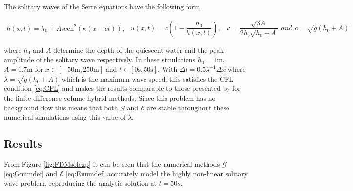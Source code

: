 \documentclass[SingleSpace,12pt,Journal]{Serre_ASCE}
\begin{document}
The solitary waves of the Serre equations have the following form
\begin{linenomath*}
\begin{subequations}
\begin{gather}
h\left(x,t\right) = h_0 + A\text{sech}^2\left( \kappa\left(x - ct\right)\right),
\end{gather}
\begin{gather}
u\left(x,t\right) = c\left(1 - \dfrac{h_0}{h(x,t)} \right),
\end{gather}
\begin{gather}
\kappa = \dfrac{\sqrt{3A}}{2h_0 \sqrt{ h_0 + A}}
\end{gather}
and
\begin{gather}
c = \sqrt{g \left(h_0 + A\right)}
\end{gather}
\label{eq:sol}
\end{subequations}
\end{linenomath*}
where $h_0$ and $A$ determine the depth of the quiescent water and the peak amplitude of the solitary wave respectively. In these simulations $h_0 = 1\text{m}$, $A = 0.7\text{m}$ for $x\in\left[-50\text{m},250\text{m}\right]$ and $t\in\left[0\text{s},50\text{s}\right]$. With $\Delta t = 0.5 \lambda^{-1} \Delta x$ where $\lambda = \sqrt{g \left(h_0 + A\right)}$ which is the maximum wave speed, this satisfies the CFL condition \eqref{eq:CFL} and makes the results comparable to those presented by  for the finite difference-volume hybrid methods. Since this problem has no background flow this means that both $\mathcal{G}$ and $\mathcal{E}$ are stable throughout these numerical simulations using this value of $\lambda$.

\subsection{Results}
From Figure \ref{fig:FDMsolexp} it can be seen that the numerical methods $\mathcal{G}$ \eqref{eq:Gnumdef} and $\mathcal{E}$ \eqref{eq:Enumdef} accurately model the highly non-linear solitary wave problem, reproducing the analytic solution at $t=50s$.
\end{document}
